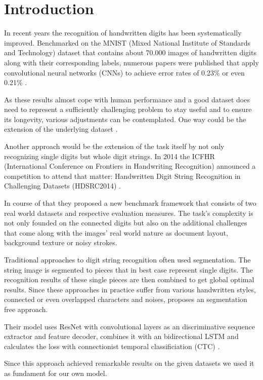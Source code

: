 \section{Introduction} \label{introduction}
In recent years the recognition of handwritten digits has been systematically improved. Benchmarked on the MNIST (Mixed National Institute of Standards and Technology)
dataset that contains about 70.000 images of handwritten digits along with their corresponding labels, numerous papers were published that apply convolutional neural networks (CNNs)
to achieve error rates of 0.23\% \cite{MNIST_2012} or even 0.21\% \cite{MNIST_boosting}.

As these results almost cope with human performance and a good dataset does need to represent a sufficiently challenging problem to stay useful and to ensure its longevity, various adjustments can be contemplated. One way could be the extension of the underlying dataset \cite{EMNIST}.

Another approach would be the extension of the task itself by not only recognizing single digits but whole digit strings. In 2014 the ICFHR (International Conference on Frontiers in Handwriting Recognition) announced a competition to attend that matter: Handwritten Digit String Recognition in Challenging Datasets (HDSRC2014) \cite{icfhr_competition}.

In course of that they proposed a new benchmark framework that consists of two real world datasets and respective evaluation measures. The task's complexity is not only founded on the connected digits but also on the additional challenges that come along with the images' real world nature as document layout, background texture or noisy strokes. 

Traditional approaches to digit string recognition often used segmentation. The string image is segmented to pieces that in best case represent single digits. The recognition results of these single pieces are then combined to get global optimal results. Since these approaches in practice suffer from various handwritten styles, connected or even overlapped characters and noises, \cite{zhan2017} proposes an segmentation free approach. 

Their model uses ResNet with convolutional layers \cite{ResNet} as an discriminative sequence extractor and feature decoder, combines it with an bidirectional LSTM and calculates the loss with connectionist temporal classificiation (CTC) \cite{CTC}.

Since this approach achieved remarkable results on the given datasets we used it as fundament for our own model.

